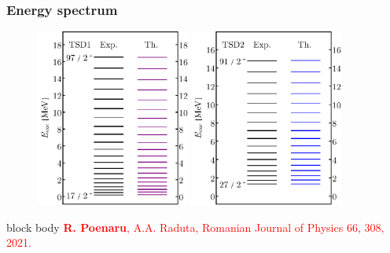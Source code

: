 \documentclass{beamer}
\begin{document}
\begin{frame}
	\frametitle{Energy spectrum}
	\begin{figure}
		\centering
		\includegraphics[width=0.45\textwidth]{figures/parity-partners-plots/tsd1.pdf}
		\includegraphics[width=0.45\textwidth]{figures/parity-partners-plots/tsd2.pdf}
	\end{figure}
	\begin{beamercolorbox}[rounded=true,shadow=false, wd=\linewidth,]{block body}
		\centering
		\textcolor{red}{\footnotesize{\textbf{R. Poenaru}, A.A. Raduta, Romanian Journal of Physics 66, 308, 2021.}}
	\end{beamercolorbox}
\end{frame}
\end{document}
